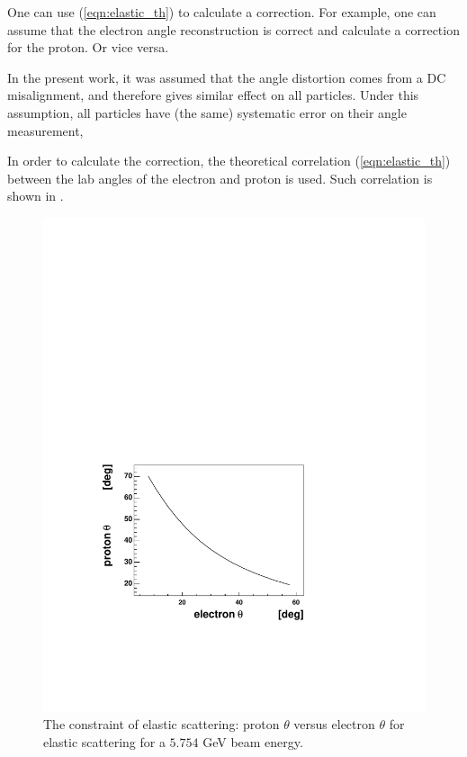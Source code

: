 One can use (\ref{eqn:elastic_th}) to calculate a correction.
For example, one
can assume that the electron angle reconstruction is correct and calculate a correction
for the proton. Or vice versa.

In the present  work, it was assumed that the angle distortion comes from a DC misalignment,
and therefore gives similar effect on all particles. Under this assumption, all particles
have (the same) systematic error on their angle measurement,

In order to calculate the correction, the theoretical correlation (\ref{eqn:elastic_th}) between the lab angles
of the electron and proton is used. Such correlation is shown in .
\begin{figure}[h]
 \begin{center}
 \includegraphics[width = 12cm, bb=60 120 500 420]{data_reduction/kine_corr/img/elastic_theory} 
  \caption[The constraint of elastic scattering]
          { The constraint of elastic scattering: proton $\theta$ versus electron $\theta$ 
                for elastic scattering for a $5.754$ GeV beam energy. }
 \label{fig:elastic_theory}
 \end{center}
\end{figure}

